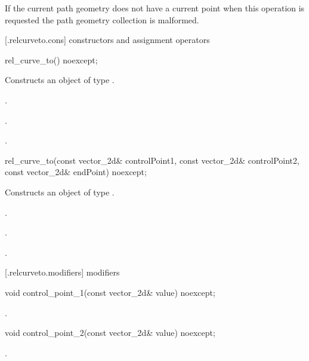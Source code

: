 \pnum
If the current path geometry does not have a current point when this operation is requested the path geometry collection is malformed.

 [\iotwod.relcurveto.cons] { constructors and assignment operators}

\begin{itemdecl}
    rel_curve_to() noexcept;
\end{itemdecl}
\begin{itemdescr}
	\pnum
	\effects
	Constructs an object of type .
	
	\pnum
	\postconditions
	.

	.

	.

\end{itemdescr}

\begin{itemdecl}
    rel_curve_to(const vector_2d& controlPoint1, const vector_2d& controlPoint2,
      const vector_2d& endPoint) noexcept;
\end{itemdecl}
\begin{itemdescr}
	\pnum
	\effects
	Constructs an object of type .
	
	\pnum
	\postconditions
	.

	.

	.

\end{itemdescr}

 [\iotwod.relcurveto.modifiers]{ modifiers}

\begin{itemdecl}
    void control_point_1(const vector_2d& value) noexcept;
\end{itemdecl}
\begin{itemdescr}
	\pnum
	\postconditions
	.
	
\end{itemdescr}

\begin{itemdecl}
    void control_point_2(const vector_2d& value) noexcept;
\end{itemdecl}
\begin{itemdescr}
	\pnum
	\postconditions
	.
	
\end{itemdescr}

